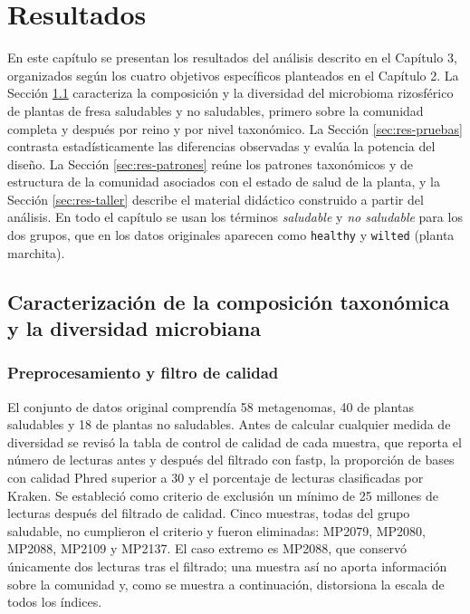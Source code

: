 \chapter{Resultados}
\label{Resultados}
\label{cap:resultados}

En este capítulo se presentan los resultados del análisis descrito en el Capítulo 3, organizados
según los cuatro objetivos específicos planteados en el Capítulo 2. La Sección \ref{sec:res-caracterizacion}
caracteriza la composición y la diversidad del microbioma rizosférico de plantas de fresa saludables y
no saludables, primero sobre la comunidad completa y después por reino y por nivel taxonómico. La
Sección \ref{sec:res-pruebas} contrasta estadísticamente las diferencias observadas y evalúa la
potencia del diseño. La Sección \ref{sec:res-patrones} reúne los patrones taxonómicos y de estructura
de la comunidad asociados con el estado de salud de la planta, y la Sección \ref{sec:res-taller}
describe el material didáctico construido a partir del análisis. En todo el capítulo se usan los
términos \emph{saludable} y \emph{no saludable} para los dos grupos, que en los datos originales
aparecen como \texttt{healthy} y \texttt{wilted} (planta marchita).

\section[Composición taxonómica y diversidad]{Caracterización de la composición taxonómica y la diversidad microbiana}
\label{sec:res-caracterizacion}

\subsection{Preprocesamiento y filtro de calidad}

El conjunto de datos original comprendía 58 metagenomas, 40 de plantas saludables y 18 de plantas
no saludables. Antes de calcular cualquier medida de diversidad se revisó la tabla de control de
calidad de cada muestra, que reporta el número de lecturas antes y después del filtrado con fastp,
la proporción de bases con calidad Phred superior a 30 y el porcentaje de lecturas clasificadas por
Kraken. Se estableció como criterio de exclusión un mínimo de 25 millones de lecturas después del
filtrado de calidad. Cinco muestras, todas del grupo saludable, no cumplieron el criterio y fueron
eliminadas: MP2079, MP2080, MP2088, MP2109 y MP2137. El caso extremo es MP2088, que conservó
únicamente dos lecturas tras el filtrado; una muestra así no aporta información sobre la comunidad
y, como se muestra a continuación, distorsiona la escala de todos los índices.

